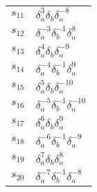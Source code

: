 \documentclass{article}
\begin{document}
\begin{center}
\begin{tabular}{ll}
$s_{11}$ & $\delta_a^{3}\delta_b^{}\delta_a^{-8}$ \\
$s_{12}$ & $\delta_a^{-3}\delta_b^{-1}\delta_a^{8}$ \\
$s_{13}$ & $\delta_a^{4}\delta_b^{}\delta_a^{-9}$ \\
$s_{14}$ & $\delta_a^{-4}\delta_b^{-1}\delta_a^{9}$ \\
$s_{15}$ & $\delta_a^{5}\delta_b^{}\delta_a^{-10}$ \\
$s_{16}$ & $\delta_a^{-5}\delta_b^{-1}\delta_a^{-10}$ \\
$s_{17}$ & $\delta_a^{6}\delta_b^{}\delta_a^{9}$ \\
$s_{18}$ & $\delta_a^{-6}\delta_b^{-1}\delta_a^{-9}$ \\
$s_{19}$ & $\delta_a^{7}\delta_b^{}\delta_a^{8}$ \\
$s_{20}$ & $\delta_a^{-7}\delta_b^{-1}\delta_a^{-8}$ \\
\bottomrule
\end{tabular}
\end{center}

\thispagestyle{empty}
\end{document}

